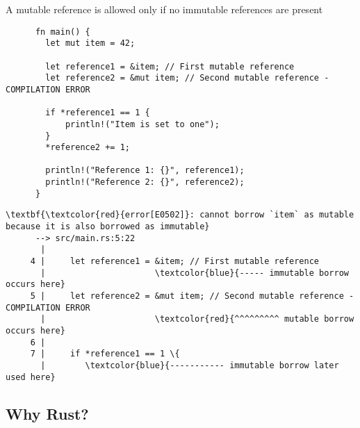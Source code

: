 \documentclass{beamer}
\begin{document}
\begin{frame}[fragile]{A mutable reference is allowed only if no immutable references are present}
  \begin{listing}
    \begin{verbatim}
      fn main() {
        let mut item = 42;
    
        let reference1 = &item; // First mutable reference
        let reference2 = &mut item; // Second mutable reference - COMPILATION ERROR
    
        if *reference1 == 1 {
            println!("Item is set to one");
        }
        *reference2 += 1;
    
        println!("Reference 1: {}", reference1);
        println!("Reference 2: {}", reference2);
      }
    \end{verbatim}
  \end{listing}

  \begin{listing}
    \tiny
    \begin{Verbatim}[commandchars=\\\{\}]
      \textbf{\textcolor{red}{error[E0502]}: cannot borrow `item` as mutable because it is also borrowed as immutable}
      --> src/main.rs:5:22
       |
     4 |     let reference1 = &item; // First mutable reference
       |                      \textcolor{blue}{----- immutable borrow occurs here}
     5 |     let reference2 = &mut item; // Second mutable reference - COMPILATION ERROR
       |                      \textcolor{red}{^^^^^^^^^ mutable borrow occurs here}
     6 |
     7 |     if *reference1 == 1 \{
       |        \textcolor{blue}{----------- immutable borrow later used here}
    \end{Verbatim}
  \end{listing}
\end{frame}

\subsection{Why Rust?}
\end{document}
